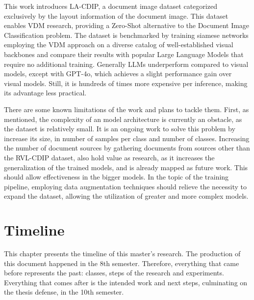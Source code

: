This work introduces \gls{LA-CDIP}, a document image dataset categorized exclusively by the layout information of the document image. This dataset enables \gls{VDM} research, providing a Zero-Shot alternative to the Document Image Classification problem. The dataset is benchmarked by training siamese networks employing the \gls{VDM} approach on a diverse catalog of well-established visual backbones and compare their results with popular Large Language Models that require no additional training. Generally \glspl{LLM} underperform compared to visual models, except with GPT-4o, which achieves a slight performance gain over visual models. Still, it is hundreds of times more expensive per inference, making its advantage less practical.

There are some known limitations of the work and plans to tackle them. First, as mentioned, the complexity of an model architecture is currently an obstacle, as the dataset is relatively small. It is an ongoing work to solve this problem by increase its size, in number of samples per class and number of classes. Increasing the number of document sources by gathering documents from sources other than the RVL-CDIP dataset, also hold value as research, as it increases the generalization of the trained models, and is already mapped as future work. This should allow effectiveness in the bigger models. In the topic of the training pipeline, employing data augmentation techniques should relieve the necessity to expand the dataset, allowing the utilization of greater and more complex models.

\section{Timeline}

This chapter presents the timeline of this master's research. The production of this document happened in the 8th semester. Therefore, everything that came before represents the past: classes, steps of the research and experiments. Everything that comes after is the intended work and next steps, culminating on the thesis defense, in the 10th semester.

